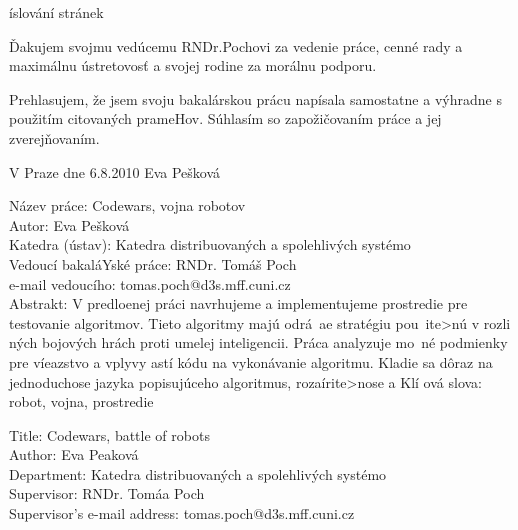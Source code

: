 \documentclass[12pt,notitlepage]{report}
\begin{document}
\normalsize %
\setcounter{page}{2} %
íslování stránek


\vspace{10mm} 


\noindent Ďakujem svojmu vedúcemu RNDr.Pochovi za vedenie práce, cenné rady a maximálnu ústretovosť a svojej rodine za morálnu podporu. 


\vspace{\fill} 
\noindent Prehlasujem, že jsem svoju bakalárskou prácu napísala samostatne a výhradne s použitím citovaných prameHov. Súhlasím so zapožičovaním práce a jej zverejňovaním.


\bigskip
\noindent V Praze dne 6.8.2010 \hspace{\fill}Eva Pešková



\tableofcontents


\newpage %


\noindent
Název práce: Codewars, vojna robotov\\
Autor: Eva Pešková\\
Katedra (ústav): Katedra distribuovaných a spolehlivých systémo\\
Vedoucí bakaláYské práce: RNDr. Tomáš Poch\\
e-mail vedoucího: tomas.poch@d3s.mff.cuni.cz \\


\noindent Abstrakt: V predloenej práci navrhujeme a implementujeme prostredie pre testovanie algoritmov. Tieto algoritmy majú odrá~ae stratégiu pou~ite>nú  v rozli
ných bojových hrách proti umelej inteligencii. Práca analyzuje mo~né podmienky pre víeazstvo a vplyvy 
astí kódu na vykonávanie algoritmu. Kladie sa dôraz na jednoduchose jazyka popisujúceho algoritmus, rozaírite>nose a 
\noindent Klí
ová slova: robot, vojna, prostredie


\vspace{10mm}


\noindent
Title: Codewars, battle of robots\\
Author: Eva Peaková\\
Department: Katedra distribuovaných a spolehlivých systémo\\
Supervisor: RNDr. Tomáa Poch\\
Supervisor's e-mail address: tomas.poch@d3s.mff.cuni.cz \\
\end{document}

